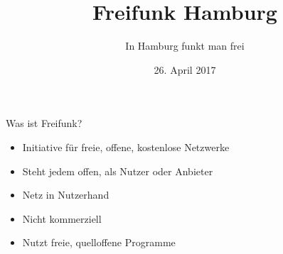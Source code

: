 \documentclass[t]{beamer}
\title{Freifunk Hamburg}
\author{In Hamburg funkt man frei}
\date{26. April 2017}
\begin{document}
  \maketitle
  
  \begin{frame}{Was ist Freifunk?}
    \begin{itemize}
      \item Initiative für freie, offene, kostenlose Netzwerke
      \item Steht jedem offen, als Nutzer oder Anbieter
      \item Netz in Nutzerhand
      \item Nicht kommerziell
      \item Nutzt freie, quelloffene Programme
    \end{itemize}
  \end{frame}
  
\end{document}
